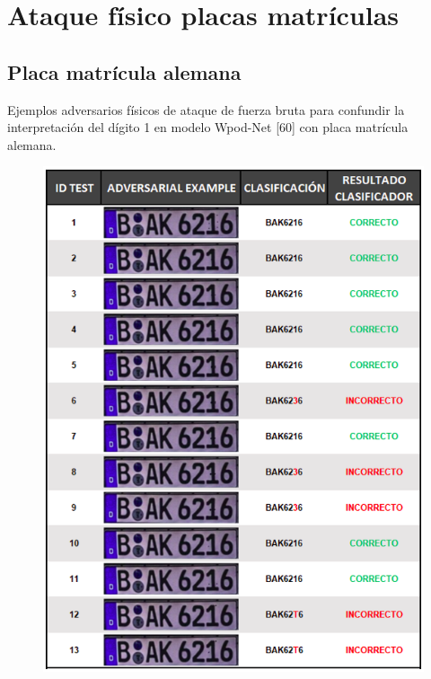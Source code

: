 
\renewcommand{\appendixname}{Anexo}
\chapter{Ataque físico placas matrículas} %

\label{AppendixB} %
\section{Placa matrícula alemana}
Ejemplos adversarios físicos de ataque de fuerza bruta para confundir la interpretación del dígito 1 en modelo Wpod-Net [60] con placa matrícula alemana.

\begin{figure}[!h]
    \centering
    \includegraphics[scale = 0.85]{Figures/figura_68_1.PNG}
    \label{fig:68_1}
\end{figure}

